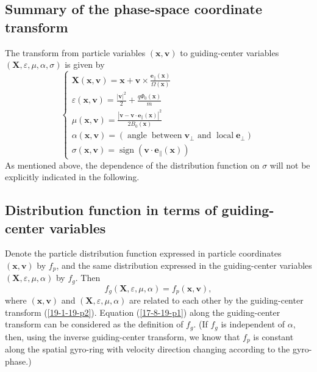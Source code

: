 \documentclass{article}
\newcommand{\infixand}{\text{ and }}
\newcommand{\tmmathbf}[1]{\ensuremath{\boldsymbol{#1}}}
\newcommand{\tmop}[1]{\ensuremath{\operatorname{#1}}}
\begin{document}
\subsection{Summary of the phase-space coordinate transform}

The transform from particle variables $(\mathbf{x}, \mathbf{v})$ to
guiding-center variables $(\mathbf{X}, \varepsilon, \mu, \alpha, \sigma)$ is
given by
\begin{equation}
  \label{21-8-25-a1} \left\{\begin{array}{l}
    \mathbf{X} (\mathbf{x}, \mathbf{v}) =\mathbf{x}+\mathbf{v} \times
    \frac{\tmmathbf{e}_{\parallel} (\mathbf{x})}{\Omega (\mathbf{x})}\\
    \varepsilon (\mathbf{x}, \mathbf{v}) = \frac{| \mathbf{v} |^2}{2} +
    \frac{q \Phi_0 (\mathbf{x})}{m}\\
    \mu (\mathbf{x}, \mathbf{v}) = \frac{| \mathbf{v}-\mathbf{v} \cdot
    \mathbf{e}_{\parallel} (\mathbf{x}) |^2}{2 B_0 (\mathbf{x})}\\
    \alpha (\mathbf{x}, \mathbf{v}) = \left( \tmop{angle} \tmop{between}
    \mathbf{v}_{\perp} \infixand \tmop{local} \mathbf{e}_{\perp} \right)\\
    \sigma (\mathbf{x}, \mathbf{v}) = \tmop{sign} (\mathbf{v} \cdot
    \mathbf{e}_{\parallel} (\mathbf{x}))
  \end{array}\right.
\end{equation}
As mentioned above, the dependence of the distribution function on $\sigma$
will not be explicitly indicated in the following.

\subsection{Distribution function in terms of guiding-center variables}

Denote the particle distribution function expressed in particle coordinates
$(\mathbf{x}, \mathbf{v})$ by $f_p$, and the same distribution expressed in
the guiding-center variables $(\mathbf{X}, \varepsilon, \mu, \alpha)$ by
$f_g$. Then
\begin{equation}
  \label{17-8-19-p1} f_g (\mathbf{X}, \varepsilon, \mu, \alpha) = f_p
  (\mathbf{x}, \mathbf{v}),
\end{equation}
where $(\mathbf{x}, \mathbf{v})$ and $(\mathbf{X}, \varepsilon, \mu, \alpha)$
are related to each other by the guiding-center transform (\ref{19-1-19-p2}).
Equation (\ref{17-8-19-p1}) along the guiding-center transform can be
considered as the definition of $f_g$. (If $f_g$ is independent of $\alpha$,
then, using the inverse guiding-center transform, we know that $f_p$ is
constant along the spatial gyro-ring with velocity direction changing
according to the gyro-phase.)
\end{document}
